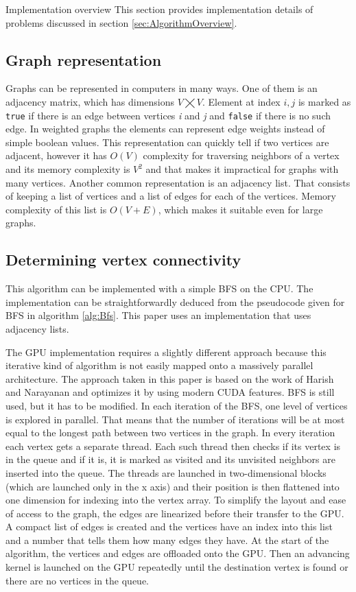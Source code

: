 \documentclass[a4paper,12pt,notitlepage,oneside]{article}
\newcommand{\parspace}[1][]{
	\ifthenelse{\isempty{#1}}{\vspace{5mm}}{\vspace{#1}}
	\par
}
\begin{document}
\begin{section}{Implementation overview}
This section provides implementation details of problems discussed in section \ref{sec:AlgorithmOverview}.

\subsection{Graph representation}
Graphs can be represented in computers in many ways. One of them is an adjacency matrix, which has dimensions \(V \bigtimes V\). Element
at index \(i, j\) is marked as \texttt{true} if there is an edge between vertices \textit{i} and \textit{j} and \texttt{false} if there is no such edge.
In weighted graphs the elements can represent edge weights instead of simple boolean values. This representation can quickly tell if two vertices are adjacent,
however it has \(O(V)\) complexity for traversing neighbors of a vertex and its memory complexity is \(V^2\) and that makes it impractical for graphs
with many vertices. Another common representation is an adjacency list. That consists of keeping a list of vertices and a list of edges for each of the vertices.
Memory complexity of this list is \(O(V + E)\), which makes it suitable even for large graphs.

\subsection{Determining vertex connectivity}
This algorithm can be implemented with a simple BFS on the CPU. The implementation can be straightforwardly deduced from the pseudocode given for BFS
in algorithm \ref{alg:Bfs}. This paper uses an implementation that uses adjacency lists.

\parspace The GPU implementation requires a slightly different approach because this iterative kind of algorithm is not easily mapped onto a massively parallel
architecture. The approach taken in this paper is based on the work of Harish and Narayanan \cite{harnar} and optimizes it by using modern
CUDA features. BFS is still used, but it has to be modified. In each iteration of the BFS, one level of vertices is explored in parallel.
That means that the number of iterations will be at most equal to the longest path between two vertices in the graph.
In every iteration each vertex gets a separate thread. Each such thread then checks if its vertex is in the queue and if it is,
it is marked as visited and its unvisited neighbors are inserted into the queue. The threads are launched in two-dimensional blocks (which are launched only in
the x axis) and their position is then flattened into one dimension for indexing into the vertex array. To simplify the layout and ease of access to the graph,
the edges are linearized before their transfer to the GPU. A compact list of edges is created and the vertices have an index into this list and a number that
tells them how many edges they have. At the start of the algorithm, the vertices and edges are offloaded onto the GPU. Then an advancing kernel is launched on the GPU repeatedly until the destination vertex is found or there are no vertices in the queue.


\end{section}
\end{document}
